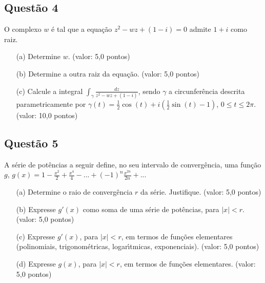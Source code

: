 \documentclass{report}
\begin{document}
\subsection{\color{blue} Quest\~ao 4}

O complexo $w$ \'e tal que a equa\c c\~ao $z^2-wz+(1-i)=0$ admite $1+i$ como raiz. 

\begin{enumerate}

\item[(a)] Determine $w$. (valor: 5,0 pontos)

\item[(b)] Determine a outra raiz da equa\c c\~ao. (valor: 5,0 pontos)

\item[(c)] Calcule a integral $\displaystyle \int_\gamma \frac{dz}{z^2-wz+(1-i)}$, sendo $\gamma$ a circunfer\^encia descrita parametricamente por $\gamma(t)=\frac1{2} \cos(t)+i(\frac1{2}\sin(t)-1)$, $0\leq t \leq 2\pi$. (valor: 10,0 pontos)

\end{enumerate}

\subsection{\color{blue} Quest\~ao 5}

A s\'erie de pot\^encias a seguir define, no seu intervalo de converg\^encia, uma fun\c c\~ao $g$, $g(x) =\displaystyle 1-\frac{x^2}{2}+\frac{x^4}{4}-...+(-1)^n\frac{x^{2n}}{2n}+...$

\begin{enumerate}

\item[(a)] Determine o raio de converg\^encia $r$ da s\'erie. Justifique. (valor: 5,0 pontos) 

\item[(b)] Expresse $g'(x)$ como soma de uma s\'erie de pot\^encias, para $|x|<r$. (valor: 5,0 pontos)

\item[(c)] Expresse $g'(x)$, para $|x|<r$, em termos de fun\c c\~oes elementares (polinomiais, trigonom\'etricas, logar\'\i tmicas, exponenciais). (valor: 5,0 pontos)

\item[(d)] Expresse $g(x)$, para $|x|<r$, em termos de fun\c c\~oes elementares. (valor: 5,0 pontos)

\end{enumerate}
\end{document}

